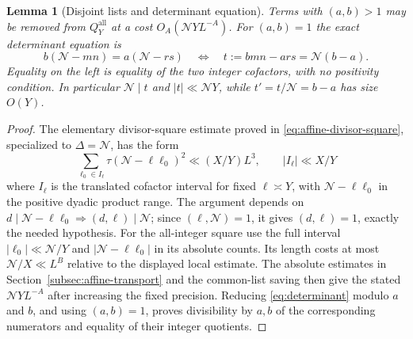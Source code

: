 \documentclass[11pt]{article}
\newtheorem{lemma}[theorem]{Lemma}
\theoremstyle{definition}
\newcommand{\GN}{\mathcal N}
\newcommand{\QQ}{Q_Y^{\mathrm{all}}}
\theoremstyle{remark}
\numberwithin{equation}{section}
\begin{document}
\begin{lemma}[Disjoint lists and determinant equation]\label{lem:determinant}
Terms with $(a,b)>1$ may be removed from $\QQ$ at a cost
$O_A(\GN YL^{-A})$. For $(a,b)=1$ the exact determinant equation is
\begin{equation}\label{eq:determinant}
 b(\GN-mn)=a(\GN-rs)
 \quad\Longleftrightarrow\quad
 t:=bmn-ars=\GN(b-a).
\end{equation}
Equality on the left is equality of the two integer cofactors,
with no positivity condition. In particular $\GN\mid t$ and
$|t|\ll\GN Y$, while $t'=t/\GN=b-a$ has size $O(Y)$.
\end{lemma}
\begin{proof}
The elementary divisor-square estimate proved in
\eqref{eq:affine-divisor-square}, specialized to $\Delta=\GN$, has the form
\begin{equation}\label{eq:divisor-square}
 \sum_{\ell_0\in I_\ell}\tau(\GN-\ell \ell_0)^2\ll(X/Y)L^3,\qquad |I_\ell|\ll X/Y
\end{equation}
where $I_\ell$ is the translated cofactor interval for fixed
$\ell\asymp Y$, with $\GN-\ell \ell_0$ in the positive dyadic
product range. The argument depends on
$d\mid\GN-\ell \ell_0\Rightarrow(d,\ell)\mid\GN$; since
$(\ell,\GN)=1$, it gives $(d,\ell)=1$, exactly the needed hypothesis.
For the all-integer square use the full interval $|\ell_0|\ll\GN/Y$
and $|\GN-\ell \ell_0|$ in its absolute counts. Its length costs at most
$\GN/X\ll L^B$ relative to the displayed local estimate.
The absolute estimates in Section~\ref{subsec:affine-transport}
and the common-list saving then give the
stated $\GN YL^{-A}$ after increasing the fixed precision.
Reducing \eqref{eq:determinant} modulo $a$ and $b$, and using
$(a,b)=1$, proves divisibility by $a,b$ of the corresponding
numerators and equality of their integer quotients.
\end{proof}
\end{document}
